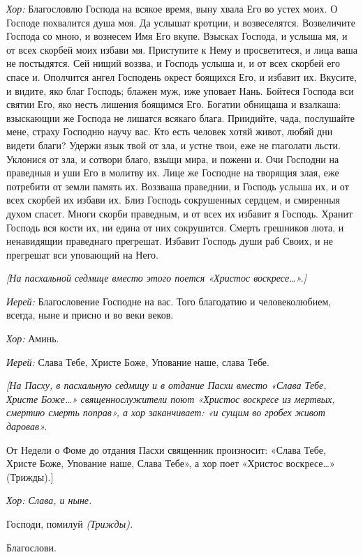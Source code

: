 \begin{mymulticols}
{\itshape Хор:} Благословлю Господа на всякое время, выну хвала Его во устех моих. О Господе похвалится душа моя. Да услышат кротции, и возвеселятся. Возвеличите Господа со мною, и вознесем Имя Его вкупе. Взысках Господа, и услыша мя, и от всех скорбей моих избави мя. Приступите к Нему и просветитеся, и лица ваша не постыдятся. Сей нищий воззва, и Господь услыша и, и от всех скорбей его спасе и. Ополчится ангел Господень окрест боящихся Его, и избавит их. Вкусите, и видите, яко благ Господь; блажен муж, иже уповает Нань. Бойтеся Господа вси святии Его, яко несть лишения боящимся Его. Богатии обнищаша и взалкаша: взыскающии же Господа не лишатся всякаго блага. Приидийте, чада, послушайте мене, страху Господню научу вас. Кто есть человек хотяй живот, любяй дни видети благи? Удержи язык твой от зла, и устне твои, еже не глаголати льсти. Уклонися от зла, и сотвори благо, взыщи мира, и пожени и. Очи Господни на праведныя и уши Его в молитву их. Лице же Господне на творящия злая, еже потребити от земли память их. Воззваша праведнии, и Господь услыша их, и от всех скорбей их избави их. Близ Господь сокрушенных сердцем, и смиренныя духом спасет. Многи скорби праведным, и от всех их избавит я Господь. Хранит Господь вся кости их, ни едина от них сокрушится. Смерть грешников люта, и ненавидящии праведнаго прегрешат. Избавит Господь души раб Своих, и не прегрешат вси уповающий на Него.

{\itshape [На пасхальной седмице вместо этого поется «Христос воскресе…».]}

{\itshape Иерей:} Благословение Господне на вас. Того благодатию и человеколюбием, всегда, ныне и присно и во веки веков.

{\itshape Хор:} Аминь.

{\itshape Иерей:} Слава Тебе, Христе Боже, Упование наше, слава Тебе.

{\itshape[На Пасху, в пасхальную седмицу и в отдание Пасхи вместо «Слава Тебе, Христе Боже…» священнослужители поют «Христос воскресе из мертвых, смертию смерть поправ», а хор заканчивает: «и сущим во гробех живот даровав». 

От Недели о Фоме до отдания Пасхи священник произносит: «Слава Тебе, Христе Боже, Упование наше, Слава Тебе», а хор поет «Христос воскресе…» (Трижды).]}

{\itshape Хор: Слава, и ныне.}

Господи, помилуй {\itshape (Трижды).}

Благослови. 



\end{mymulticols}
